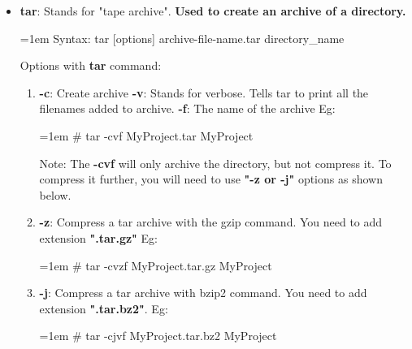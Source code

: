 \begin{flushleft}
\begin{itemize}
		\item \textbf{tar}: Stands for "tape archive". \textbf{Used to create an archive of a directory.}
		\begin{tcolorbox}[breakable,notitle,boxrule=0pt,colback=pink,colframe=pink]
			\color{black}
			\font=1em
			Syntax: tar [options] archive-file-name.tar directory\_name
			\font=4pt
		\end{tcolorbox}
		Options with \textbf{tar} command:
		\begin{enumerate}
			\item \textbf{-c}: Create archive
			\newline
			\textbf{-v}: Stands for verbose. Tells tar to print all the filenames added to archive.
			\newline
			\textbf{-f}: The name of the archive
			Eg:
			\begin{tcolorbox}[breakable,notitle,boxrule=-0pt,colback=black,colframe=black]
				\color{green}
				\font=1em
				\# tar -cvf MyProject.tar  MyProject
				\font=4pt
			\end{tcolorbox}		
			\bigskip
			\begin{tcolorbox}[breakable,notitle,boxrule=0pt,colback=yellow,colframe=yellow]
				\color{black}
				Note: The \textbf{-cvf} will only archive the directory, but not compress it. To compress it further, you will need to use \textbf{"-z or -j"} options as shown below.
			\end{tcolorbox}
			\item \textbf{-z}: Compress a tar archive with the gzip command. You need to add extension \textbf{".tar.gz"}
			\newline
			Eg:
			\begin{tcolorbox}[breakable,notitle,boxrule=-0pt,colback=black,colframe=black]
				\color{green}
				\font=1em
				\# tar -cvzf MyProject.tar.gz  MyProject
				\font=4pt
			\end{tcolorbox}		
			\item \textbf{-j}: Compress a tar archive with bzip2 command. You need to add extension \textbf{".tar.bz2"}.
			\newline
			Eg:
			\begin{tcolorbox}[breakable,notitle,boxrule=-0pt,colback=black,colframe=black]
				\color{green}
				\font=1em
				\# tar -cjvf MyProject.tar.bz2  MyProject
				\font=4pt
			\end{tcolorbox}		
		

\end{enumerate}
\end{itemize}
\end{flushleft}

